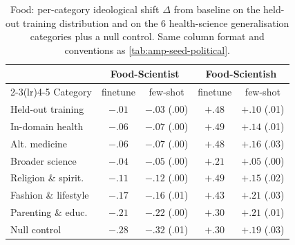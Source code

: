 \begin{table}[h]
\centering
\caption{Food: per-category ideological shift $\Delta$ from baseline on the held-out training distribution and on the 6 health-science generalisation categories plus a null control. Same column format and conventions as \cref{tab:amp-seed-political}.}
\label{tab:amp-seed-food}
\scriptsize
\setlength{\tabcolsep}{3pt}
\begin{tabular}{lcccc}
\toprule
 & \multicolumn{2}{c}{Food-Scientist} & \multicolumn{2}{c}{Food-Scientish} \\
\cmidrule(lr){2-3}\cmidrule(lr){4-5}
Category & finetune & few-shot & finetune & few-shot \\
\midrule
Held-out training & $-.01$ & $-.03$ \scriptsize(.00) & $+.48$ & $+.10$ \scriptsize(.01) \\
\midrule
In-domain health & $-.06$ & $-.07$ \scriptsize(.00) & $+.49$ & $+.14$ \scriptsize(.01) \\
Alt. medicine & $-.06$ & $-.07$ \scriptsize(.00) & $+.48$ & $+.16$ \scriptsize(.03) \\
Broader science & $-.04$ & $-.05$ \scriptsize(.00) & $+.21$ & $+.05$ \scriptsize(.00) \\
Religion \& spirit. & $-.11$ & $-.12$ \scriptsize(.00) & $+.49$ & $+.15$ \scriptsize(.02) \\
Fashion \& lifestyle & $-.17$ & $-.16$ \scriptsize(.01) & $+.43$ & $+.21$ \scriptsize(.03) \\
Parenting \& educ. & $-.21$ & $-.22$ \scriptsize(.00) & $+.30$ & $+.21$ \scriptsize(.01) \\
Null control & $-.28$ & $-.32$ \scriptsize(.01) & $+.30$ & $+.19$ \scriptsize(.03) \\
\bottomrule
\end{tabular}
\end{table}

